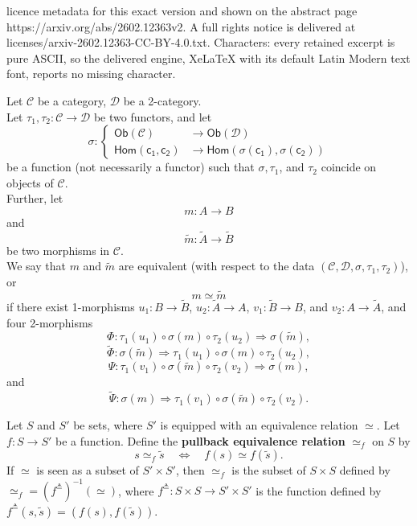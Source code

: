 \documentclass[10pt,a4paper]{amsart}
\begin{document}
licence metadata for this exact version and shown on the abstract page https://arxiv.org/abs/2602.12363v2. A full rights notice is delivered at licenses/arxiv-2602.12363-CC-BY-4.0.txt. Characters: every retained excerpt is pure ASCII, so the delivered engine, XeLaTeX with its default Latin Modern text font, reports no missing character.
\begin{definition}
  \label{definition-master}
  Let $\mathcal{C}$ be a category, $\mathcal{D}$ be a 2-category. \\
  Let $\tau_1,\tau_2 : \mathcal{C} \to \mathcal{D}$ be two functors, and let
  \[ \sigma : \begin{cases} \mathsf{Ob(\mathcal{C})} &\to \mathsf{Ob(\mathcal{D})} \\ \mathsf{Hom(c_1,c_2)} &\to \mathsf{Hom(\sigma(c_1),\sigma(c_2))} \end{cases} \]
  be a function (not necessarily a functor) such that $\sigma, \tau_1$, and $\tau_2$ coincide on objects of $\mathcal{C}$. \\
  Further, let
  \[ m : A \to B \]
  and
  \[ \tilde{m} : \tilde{A} \to \tilde{B} \]
  be two morphisms in $\mathcal{C}$.  \\
  We say that $m$ and $\tilde{m}$ are equivalent (with respect to the data $(\mathcal{C},\mathcal{D},\sigma,\tau_1,\tau_2)$), or
  \[ m \simeq \tilde{m} \]
  if there exist 1-morphisms $u_1 : B \to \tilde{B}$, $u_2 : \tilde{A} \to A$, $v_1 : \tilde{B} \to B$, and $v_2 : A \to \tilde{A}$, and four 2-morphisms
  \[ \Phi : \tau_1(u_1) \circ \sigma(m) \circ \tau_2(u_2) \Rightarrow \sigma(\tilde{m}), \]
  \[ \tilde{\Phi} : \sigma(\tilde{m}) \Rightarrow \tau_1(u_1) \circ \sigma(m) \circ \tau_2(u_2), \]
  \[ \Psi : \tau_1(v_1) \circ \sigma(\tilde{m}) \circ \tau_2(v_2) \Rightarrow \sigma(m), \]
  and
  \[ \tilde{\Psi} : \sigma(m) \Rightarrow \tau_1(v_1) \circ \sigma(\tilde{m}) \circ \tau_2(v_2) . \]
\end{definition}

\begin{definition}
  \label{definition-pullback-equivalence-relation}
Let $S$ and $S'$ be sets, where $S'$ is equipped with an equivalence relation $\simeq$. Let $f : S \to S'$ be a function. Define the \textbf{pullback equivalence relation} $\simeq_f$ on $S$ by 
\[
  s \simeq_f \tilde{s} \quad \Longleftrightarrow \quad f(s) \simeq f(\tilde{s}).
\]
If $\simeq$ is seen as a subset of $S' \times S'$, then $\simeq_f$ is the subset of $S \times S$ defined by $\simeq_f = (f^{\triangleq})^{-1}(\simeq)$, where $f^{\triangleq} : S \times S \to S' \times S'$ is the function defined by $f^{\triangleq}(s,\tilde{s}) = (f(s), f(\tilde{s}))$.
\end{definition}
\end{document}
